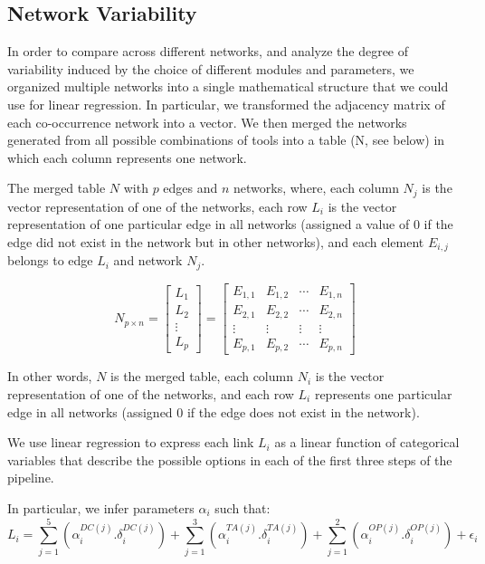   \subsection*{Network Variability}
  \vspace{-5mm}
 In order to compare across different networks, and analyze the degree of variability induced by the choice of different modules and parameters, we organized multiple networks into a single mathematical structure that we could use for linear regression.
 In particular, we transformed the adjacency matrix of each co-occurrence network into a vector.
 We then merged the networks generated from all possible combinations of tools into a table (N, see below) in which each column represents one network.

 The merged table $N$ with $p$ edges and $n$ networks, where, each column $N_j$ is the vector representation of one of the networks, each row $L_i$ is the vector representation of one particular edge in all networks (assigned a value of 0 if the edge did not exist in the network but in other networks), and each element $E_{i,j}$ belongs to edge $L_i$ and network $N_j$.

  \begin{equation*}
   N_{p \times n} =
   \begin{bmatrix}
     L_1 \\
     L_2 \\
     \vdots \\
     L_p
   \end{bmatrix}
   =
   \begin{bmatrix}
     E_{1,1} & E_{1,2} & \cdots  & E_{1, n} \\
     E_{2,1} & E_{2,2} & \cdots  & E_{2, n} \\
     \vdots & \vdots & \vdots  & \vdots \\
     E_{p,1} & E_{p,2} & \cdots  & E_{p, n}
   \end{bmatrix}
  \end{equation*}

  In other words, $N$ is the merged table, each column $N_i$ is the vector representation of one of the networks, and each row $L_i$ represents one particular edge in all networks (assigned 0 if the edge does not exist in the network).

  We use linear regression to express each link $L_i$ as a linear function of categorical variables that describe the possible options in each of the first three steps of the pipeline.

  In particular, we infer parameters $\alpha_i$ such that:
   \begin{equation*}
       L_i = \sum_{j=1}^5 \left( \alpha^{DC(j)}_i.\delta^{DC(j)}_i \right) +
             \sum_{j=1}^3 \left( \alpha^{TA(j)}_i.\delta^{TA(j)}_i \right) +
             \sum_{j=1}^2 \left( \alpha^{OP(j)}_i.\delta^{OP(j)}_i \right) +
             \epsilon_i
   \end{equation*}

